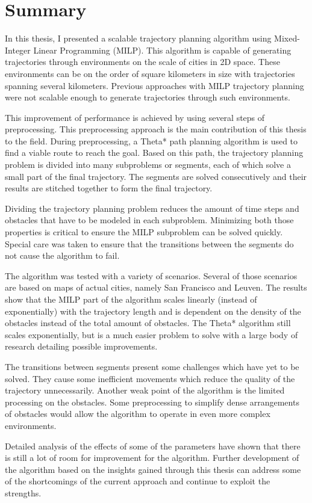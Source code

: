 \section{Summary}
In this thesis, I presented a scalable trajectory planning algorithm using Mixed-Integer Linear Programming (MILP). This algorithm is capable of generating trajectories through environments on the scale of cities in 2D space. These environments can be on the order of square kilometers in size with trajectories spanning several kilometers. Previous approaches with MILP trajectory planning were not scalable enough to generate trajectories through such environments.
\par
This improvement of performance is achieved by using several steps of preprocessing. This preprocessing approach is the main contribution of this thesis to the field. During preprocessing, a Theta* path planning algorithm is used to find a viable route to reach the goal. Based on this path, the trajectory planning problem is divided into many subproblems or segments, each of which solve a small part of the final trajectory. The segments are solved consecutively and their results are stitched together to form the final trajectory.
\par
Dividing the trajectory planning problem reduces the amount of time steps and obstacles that have to be modeled in each subproblem. Minimizing both those properties is critical to ensure the MILP subproblem can be solved quickly. Special care was taken to ensure that the transitions between the segments do not cause the algorithm to fail.
\par
The algorithm was tested with a variety of scenarios. Several of those scenarios are based on maps of actual cities, namely San Francisco and Leuven. The results show that the MILP part of the algorithm scales linearly (instead of exponentially) with the trajectory length and is dependent on the density of the obstacles instead of the total amount of obstacles. The Theta* algorithm still scales exponentially, but is a much easier problem to solve with a large body of research detailing possible improvements.
\par
The transitions between segments present some challenges which have yet to be solved. They cause some inefficient movements which reduce the quality of the trajectory unnecessarily. Another weak point of the algorithm is the limited processing on the obstacles. Some preprocessing to simplify dense arrangements of obstacles would allow the algorithm to operate in even more complex environments.
\par
Detailed analysis of the effects of some of the parameters have shown that there is still a lot of room for improvement for the algorithm. Further development of the algorithm based on the insights gained through this thesis can address some of the shortcomings of the current approach and continue to exploit the strengths.

